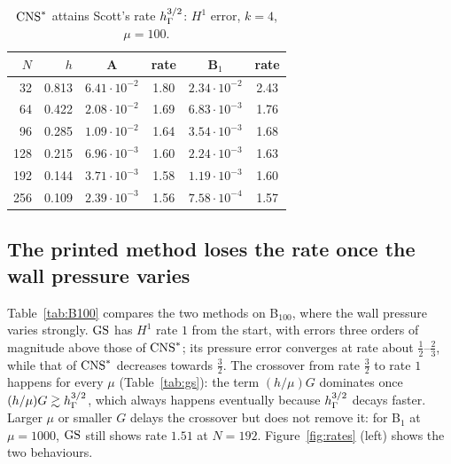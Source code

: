\begin{table}[t]
\centering\small
\caption{$\mathrm{CNS}^\ast$ attains Scott's rate $h_\Gamma^{3/2}$: $H^1$ error, $k=4$, $\mu=100$.}\label{tab:cns}
\begin{tabular}{rrcccc}
\toprule
$N$ & $h$ & A & rate & B$_1$ & rate\\
\midrule
32 & 0.813 & $6.41\cdot10^{-2}$ & 1.80 & $2.34\cdot10^{-2}$ & 2.43\\
64 & 0.422 & $2.08\cdot10^{-2}$ & 1.69 & $6.83\cdot10^{-3}$ & 1.76\\
96 & 0.285 & $1.09\cdot10^{-2}$ & 1.64 & $3.54\cdot10^{-3}$ & 1.68\\
128 & 0.215 & $6.96\cdot10^{-3}$ & 1.60 & $2.24\cdot10^{-3}$ & 1.63\\
192 & 0.144 & $3.71\cdot10^{-3}$ & 1.58 & $1.19\cdot10^{-3}$ & 1.60\\
256 & 0.109 & $2.39\cdot10^{-3}$ & 1.56 & $7.58\cdot10^{-4}$ & 1.57\\
\bottomrule
\end{tabular}
\end{table}

\subsection{The printed method loses the rate once the wall pressure varies}
Table~\ref{tab:B100} compares the two methods on B$_{100}$, where the wall pressure varies strongly. $\mathrm{GS}$ has $H^1$ rate $1$ from the start, with errors three orders of magnitude above those of $\mathrm{CNS}^\ast$; its pressure error converges at rate about $\frac12$--$\frac23$, while that of $\mathrm{CNS}^\ast$ decreases towards $\frac32$. The crossover from rate $\frac32$ to rate $1$ happens for every $\mu$ (Table~\ref{tab:gs}): the term $(h/\mu)G$ dominates once $(h/\mu)G\gtrsim h_\Gamma^{3/2}$, which always happens eventually because $h_\Gamma^{3/2}$ decays faster. Larger $\mu$ or smaller $G$ delays the crossover but does not remove it: for B$_1$ at $\mu=1000$, $\mathrm{GS}$ still shows rate $1.51$ at $N=192$. Figure~\ref{fig:rates} (left) shows the two behaviours.

